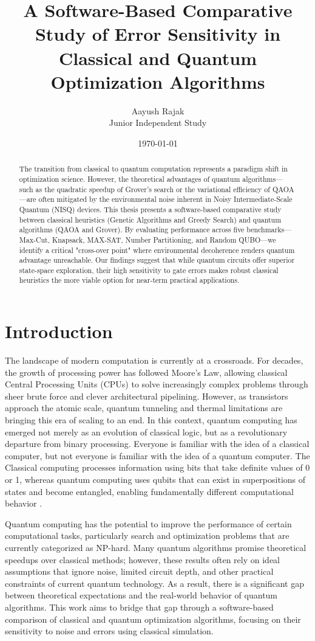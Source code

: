 \documentclass[12pt]{article}
\title{\textbf{A Software-Based Comparative Study of Error Sensitivity in Classical and Quantum Optimization Algorithms}}
\author{Aayush Rajak \\ Junior Independent Study}
\date{\today}
\begin{document}
\maketitle

\begin{abstract}
The transition from classical to quantum computation represents a paradigm shift in optimization science. However, the theoretical advantages of quantum algorithms—such as the quadratic speedup of Grover’s search or the variational efficiency of QAOA—are often mitigated by the environmental noise inherent in Noisy Intermediate-Scale Quantum (NISQ) devices. This thesis presents a software-based comparative study between classical heuristics (Genetic Algorithms and Greedy Search) and quantum algorithms (QAOA and Grover). By evaluating performance across five benchmarks—Max-Cut, Knapsack, MAX-SAT, Number Partitioning, and Random QUBO—we identify a critical "cross-over point" where environmental decoherence renders quantum advantage unreachable. Our findings suggest that while quantum circuits offer superior state-space exploration, their high sensitivity to gate errors makes robust classical heuristics the more viable option for near-term practical applications.
\end{abstract}

\newpage

\section{Introduction}
The landscape of modern computation is currently at a crossroads. For decades, the growth of processing power has followed Moore’s Law, allowing classical Central Processing Units (CPUs) to solve increasingly complex problems through sheer brute force and clever architectural pipelining. However, as transistors approach the atomic scale, quantum tunneling and thermal limitations are bringing this era of scaling to an end. In this context, quantum computing has emerged not merely as an evolution of classical logic, but as a revolutionary departure from binary processing. Everyone is familiar with the idea of a classical computer, but not everyone is familiar with the idea of a quantum computer. The Classical computing processes information using bits that take definite values of 0 or 1, whereas quantum computing uses qubits that can exist in superpositions of states and become entangled, enabling fundamentally different computational behavior \cite{wong2019}.

Quantum computing has the potential to improve the performance of certain computational tasks, particularly search and optimization problems that are currently categorized as NP-hard. Many quantum algorithms promise theoretical speedups over classical methods; however, these results often rely on ideal assumptions that ignore noise, limited circuit depth, and other practical constraints of current quantum technology. As a result, there is a significant gap between theoretical expectations and the real-world behavior of quantum algorithms. This work aims to bridge that gap through a software-based comparison of classical and quantum optimization algorithms, focusing on their sensitivity to noise and errors using classical simulation.
\end{document}
